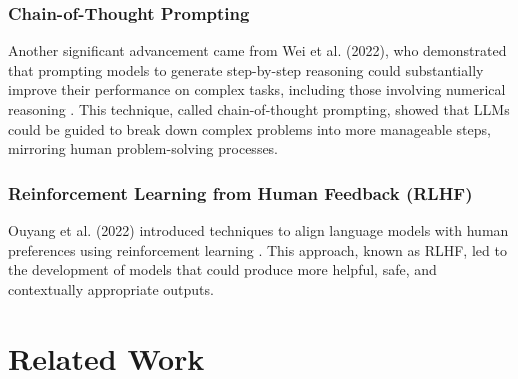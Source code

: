 \documentclass[logo,msc]{infthesis}           %
\begin{document}
\subsection*{Chain-of-Thought Prompting}
Another significant advancement came from Wei et al. (2022), who demonstrated that prompting models to generate step-by-step reasoning could substantially improve their performance on complex tasks, including those involving numerical reasoning \cite{wei2022chain}. This technique, called chain-of-thought prompting, showed that LLMs could be guided to break down complex problems into more manageable steps, mirroring human problem-solving processes.
\subsection*{Reinforcement Learning from Human Feedback (RLHF)}
Ouyang et al. (2022) introduced techniques to align language models with human preferences using reinforcement learning \cite{ouyang2022training}. This approach, known as RLHF, led to the development of models that could produce more helpful, safe, and contextually appropriate outputs.

\chapter{Related Work}
\end{document}
